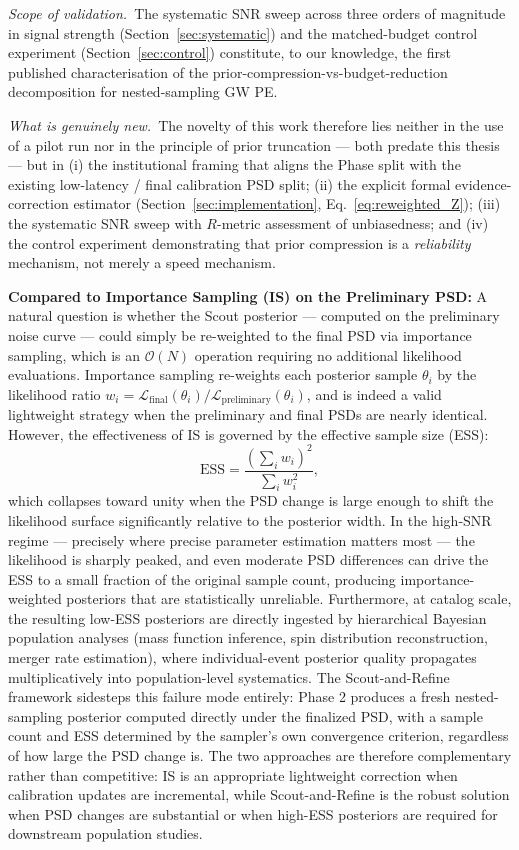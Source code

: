 \documentclass[12pt]{article}
\begin{document}
\textit{Scope of validation.}\ The systematic SNR sweep across three orders of magnitude in signal strength (Section~\ref{sec:systematic}) and the matched-budget control experiment (Section~\ref{sec:control}) constitute, to our knowledge, the first published characterisation of the prior-compression-vs-budget-reduction decomposition for nested-sampling GW PE.

\textit{What is genuinely new.}\ The novelty of this work therefore lies neither in the use of a pilot run nor in the principle of prior truncation --- both predate this thesis --- but in (i) the institutional framing that aligns the Phase split with the existing low-latency / final calibration PSD split; (ii) the explicit formal evidence-correction estimator (Section~\ref{sec:implementation}, Eq.~\ref{eq:reweighted_Z}); (iii) the systematic SNR sweep with $R$-metric assessment of unbiasedness; and (iv) the control experiment demonstrating that prior compression is a \emph{reliability} mechanism, not merely a speed mechanism.

\textbf{Compared to Importance Sampling (IS) on the Preliminary PSD:} A natural question is whether the Scout posterior — computed on the preliminary noise curve — could simply be re-weighted to the final PSD via importance sampling, which is an $\mathcal{O}(N)$ operation requiring no additional likelihood evaluations. Importance sampling re-weights each posterior sample $\theta_i$ by the likelihood ratio $w_i = \mathcal{L}_{\text{final}}(\theta_i) / \mathcal{L}_{\text{preliminary}}(\theta_i)$, and is indeed a valid lightweight strategy when the preliminary and final PSDs are nearly identical. However, the effectiveness of IS is governed by the effective sample size (ESS):
\begin{equation}
    \text{ESS} = \frac{\left(\sum_{i} w_i\right)^2}{\sum_{i} w_i^2},
\end{equation}
which collapses toward unity when the PSD change is large enough to shift the likelihood surface significantly relative to the posterior width. In the high-SNR regime — precisely where precise parameter estimation matters most — the likelihood is sharply peaked, and even moderate PSD differences can drive the ESS to a small fraction of the original sample count, producing importance-weighted posteriors that are statistically unreliable. Furthermore, at catalog scale, the resulting low-ESS posteriors are directly ingested by hierarchical Bayesian population analyses (mass function inference, spin distribution reconstruction, merger rate estimation), where individual-event posterior quality propagates multiplicatively into population-level systematics. The Scout-and-Refine framework sidesteps this failure mode entirely: Phase 2 produces a fresh nested-sampling posterior computed directly under the finalized PSD, with a sample count and ESS determined by the sampler's own convergence criterion, regardless of how large the PSD change is. The two approaches are therefore complementary rather than competitive: IS is an appropriate lightweight correction when calibration updates are incremental, while Scout-and-Refine is the robust solution when PSD changes are substantial or when high-ESS posteriors are required for downstream population studies.
\end{document}
